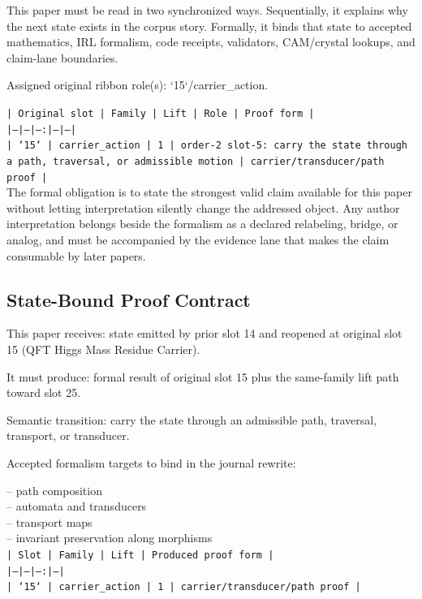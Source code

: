 \documentclass[11pt]{article}
\begin{document}
This paper must be read in two synchronized ways. Sequentially, it explains why
the next state exists in the corpus story. Formally, it binds that state to
accepted mathematics, IRL formalism, code receipts, validators, CAM/crystal
lookups, and claim-lane boundaries.

Assigned original ribbon role(s): `15`/carrier\_action.

\noindent\texttt{| Original slot | Family | Lift | Role | Proof form |}\\
\noindent\texttt{|---|---|---:|---|---|}\\
\noindent\texttt{| `15` | carrier\_action | 1 | order-2 slot-5: carry the state through a path, traversal, or admissible motion | carrier/transducer/path proof |}\\

The formal obligation is to state the strongest valid claim available for this
paper without letting interpretation silently change the addressed object. Any
author interpretation belongs beside the formalism as a declared relabeling,
bridge, or analog, and must be accompanied by the evidence lane that makes the
claim consumable by later papers.

\subsection*{State-Bound Proof Contract}

This paper receives: state emitted by prior slot 14 and reopened at original slot 15 (QFT Higgs Mass Residue Carrier).

It must produce: formal result of original slot 15 plus the same-family lift path toward slot 25.

Semantic transition: carry the state through an admissible path, traversal, transport, or transducer.

Accepted formalism targets to bind in the journal rewrite:

\noindent{}-- path composition\\
\noindent{}-- automata and transducers\\
\noindent{}-- transport maps\\
\noindent{}-- invariant preservation along morphisms\\

\noindent\texttt{| Slot | Family | Lift | Produced proof form |}\\
\noindent\texttt{|---|---|---:|---|}\\
\noindent\texttt{| `15` | carrier\_action | 1 | carrier/transducer/path proof |}\\
\end{document}
